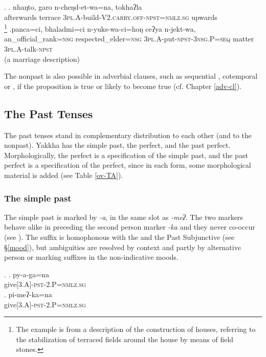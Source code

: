 \ex. \ag. nhaŋto, garo n-cheŋd-et-wa=na,      tokhaʔla\\
afterwards terrace {\scshape 3pl.A-}build{\scshape -V2.carry.off-npst=nmlz.sg} upwards\\
\footnote{The example is from a description of the  construction of houses, referring to the stabilization of terraced fields around the house by means of field stones.}  
\bg.panca=ci, bhaladmi=ci n-yuks-wa-ci=hoŋ  ceʔya n-jekt-wa,\\
an\_official\_rank{\scshape =nsg} respected\_elder{\scshape =nsg} {\scshape 3pl.A-}put{\scshape -npst-3nsg.P=seq} matter {\scshape 3pl.A-}talk{\scshape -npst}\\
 (a marriage description) 

The nonpast is also possible in adverbial  clauses, such as sequential \Last[b], cotemporal or , if the proposition is true or likely to become true (cf. Chapter \ref{adv-cl}). 

\subsection{The Past Tenses}\label{pst}

The past tenses stand in complementary distribution to each other (and to the nonpast). Yakkha has the simple past, the perfect, and the past perfect. Morphologically, the perfect is a specification of the simple past, and the past perfect is a specification of the perfect, since in each form, some morphological material is added (see Table \ref{ov-TA}).

\subsubsection{The simple past}\label{sim-pst}

The simple past is marked by \emph{-a}, in the same slot as \emph{-meʔ}. The two markers behave alike in preceding the second person marker \emph{-ka} and they never co-occur (see \Next). The suffix is homophonous with the  and the Past Subjunctive (see §\ref{mood}), but ambiguities are resolved by context and partly by alternative person or  marking suffixes in the non-indicative moods.

\ex. \ag.  py-a-ga=na\\
			give{\scshape [3.A]-pst-2.P=nmlz.sg}\\
	\bg. pi-meʔ-ka=na\\ 
			give{\scshape [3.A]-pst-2.P=nmlz.sg}\\
			
